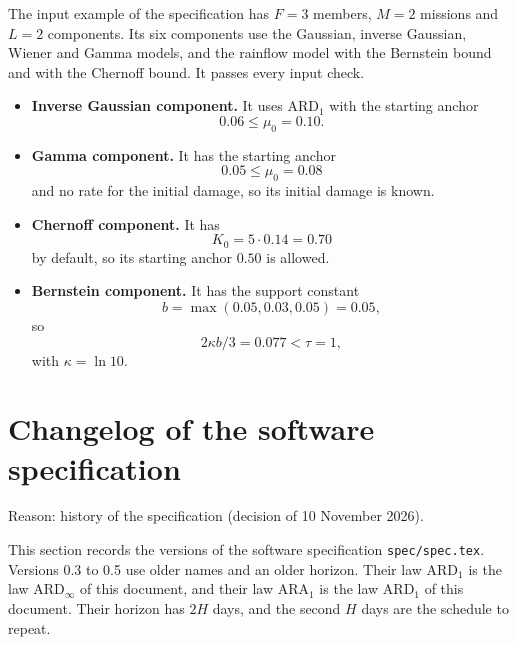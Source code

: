 \documentclass[11pt,a4paper]{article}
\theoremstyle{plain}
\theoremstyle{definition}
\theoremstyle{remark}
\begin{document}
The input example of the specification has $F = 3$ members, $M = 2$ missions and $L = 2$ components.
Its six components use the Gaussian, inverse Gaussian, Wiener and Gamma models, and the rainflow model with the Bernstein bound and with the Chernoff bound.
It passes every input check.
\begin{itemize}
  \item \textbf{Inverse Gaussian component.}
    It uses $\text{ARD}_1$ with the starting anchor
    \begin{equation}
      0.06 \le \mu_0 = 0.10.
    \end{equation}
  \item \textbf{Gamma component.}
    It has the starting anchor
    \begin{equation}
      0.05 \le \mu_0 = 0.08
    \end{equation}
    and no rate for the initial damage, so its initial damage is known.
  \item \textbf{Chernoff component.}
    It has
    \begin{equation}
      K_0 = 5 \cdot 0.14 = 0.70
    \end{equation}
    by default, so its starting anchor $0.50$ is allowed.
  \item \textbf{Bernstein component.}
    It has the support constant
    \begin{equation}
      b = \max(0.05, 0.03, 0.05) = 0.05,
    \end{equation}
    so
    \begin{equation}
      2\kappa b/3 = 0.077 < \tau = 1,
    \end{equation}
    with $\kappa = \ln 10$.
\end{itemize}

\section{Changelog of the software specification}
\label{sec:spec_changelog}

Reason: history of the specification (decision of 10 November 2026).


This section records the versions of the software specification \texttt{spec/spec.tex}.
Versions 0.3 to 0.5 use older names and an older horizon.
Their law $\text{ARD}_1$ is the law $\text{ARD}_\infty$ of this document, and their law $\text{ARA}_1$ is the law $\text{ARD}_1$ of this document.
Their horizon has $2H$ days, and the second $H$ days are the schedule to repeat.
\end{document}
